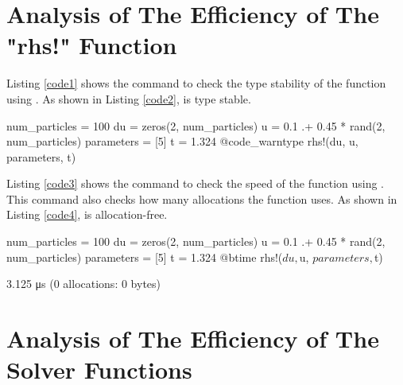 \documentclass{article}
\begin{document}
\section{Analysis of The Efficiency of The "rhs!" Function}

Listing \ref{code1} shows the command to check the type stability of the  function using . As shown in Listing \ref{code2},  is type stable.

{\LARGE
\begin{jllisting}[caption={Type stable check command.}, label=code1]
num_particles = 100
du = zeros(2, num_particles)
u = 0.1 .+ 0.45 * rand(2, num_particles)
parameters = [5]
t = 1.324
@code_warntype rhs!(du, u, parameters, t)
\end{jllisting}
}

{\LARGE
{}
}

Listing \ref{code3} shows the command to check the speed of the  function using . This command also checks how many allocations the function uses. As shown in Listing \ref{code4},  is allocation-free.

{\LARGE
\begin{jllisting}[caption={Type stable check command.}, label=code3]
num_particles = 100
du = zeros(2, num_particles)
u = 0.1 .+ 0.45 * rand(2, num_particles)
parameters = [5]
t = 1.324
@btime rhs!($du, $u, $parameters, $t)
\end{jllisting}
}

{\LARGE
\begin{jllisting}[caption={Type stable check output.}, label=code4]
3.125 μs (0 allocations: 0 bytes)
\end{jllisting}
}

\section{Analysis of The Efficiency of The Solver Functions}
\end{document}
